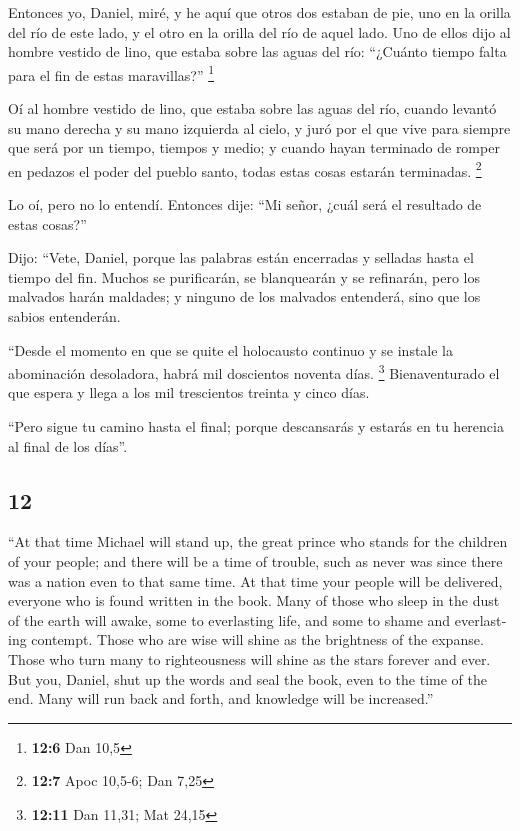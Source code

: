 \begin{paracol}{2}
 Entonces yo, Daniel, miré, y he aquí que otros dos
estaban de pie, uno en la orilla del río de este lado, y el otro en la
orilla del río de aquel lado.  Uno de ellos dijo al hombre
vestido de lino, que estaba sobre las aguas del río: ``¿Cuánto tiempo
falta para el fin de estas maravillas?'' \footnote{\textbf{12:6} Dan
  10,5}

 Oí al hombre vestido de lino, que estaba sobre las aguas
del río, cuando levantó su mano derecha y su mano izquierda al cielo, y
juró por el que vive para siempre que será por un tiempo, tiempos y
medio; y cuando hayan terminado de romper en pedazos el poder del pueblo
santo, todas estas cosas estarán terminadas. \footnote{\textbf{12:7}
  Apoc 10,5-6; Dan 7,25}

 Lo oí, pero no lo entendí. Entonces dije: ``Mi señor,
¿cuál será el resultado de estas cosas?''

 Dijo: ``Vete, Daniel, porque las palabras están
encerradas y selladas hasta el tiempo del fin.  Muchos se
purificarán, se blanquearán y se refinarán, pero los malvados harán
maldades; y ninguno de los malvados entenderá, sino que los sabios
entenderán.

 ``Desde el momento en que se quite el holocausto
continuo y se instale la abominación desoladora, habrá mil doscientos
noventa días. \footnote{\textbf{12:11} Dan 11,31; Mat 24,15}
 Bienaventurado el que espera y llega a los mil
trescientos treinta y cinco días.

 ``Pero sigue tu camino hasta el final; porque
descansarás y estarás en tu herencia al final de los días''.
\switchcolumn \begin{otherlanguage}{english}

\hypertarget{section-23}{%
\section{12}\label{section-23}}

 ``At that time Michael will stand up, the great prince
who stands for the children of your people; and there will be a time of
trouble, such as never was since there was a nation even to that same
time. At that time your people will be delivered, everyone who is found
written in the book.  Many of those who sleep in the dust
of the earth will awake, some to everlasting life, and some to shame and
everlasting contempt.  Those who are wise will shine as
the brightness of the expanse. Those who turn many to righteousness will
shine as the stars forever and ever.  But you, Daniel,
shut up the words and seal the book, even to the time of the end. Many
will run back and forth, and knowledge will be increased.''


\end{otherlanguage}
\end{paracol}
